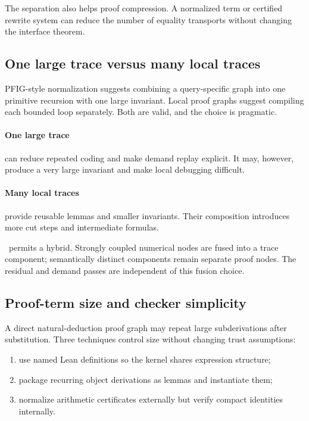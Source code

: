 The separation also helps proof compression.  A normalized term or certified rewrite system can reduce the number of equality transports without changing the interface theorem.

\subsection{One large trace versus many local traces}

PFIG-style normalization suggests combining a query-specific graph into one primitive recursion with one large invariant.  Local proof graphs suggest compiling each bounded loop separately.  Both are valid, and the choice is pragmatic.

\paragraph{One large trace} can reduce repeated coding and make demand replay explicit.  It may, however, produce a very large invariant and make local debugging difficult.

\paragraph{Many local traces} provide reusable lemmas and smaller invariants.  Their composition introduces more cut steps and intermediate formulas.

\CIFER\ permits a hybrid.  Strongly coupled numerical nodes are fused into a trace component; semantically distinct components remain separate proof nodes.  The residual and demand passes are independent of this fusion choice.

\subsection{Proof-term size and checker simplicity}

A direct natural-deduction proof graph may repeat large subderivations after substitution.  Three techniques control size without changing trust assumptions:

\begin{enumerate}
\item use named Lean definitions so the kernel shares expression structure;
\item package recurring object derivations as lemmas and instantiate them;
\item normalize arithmetic certificates externally but verify compact identities internally.
\end{enumerate}

